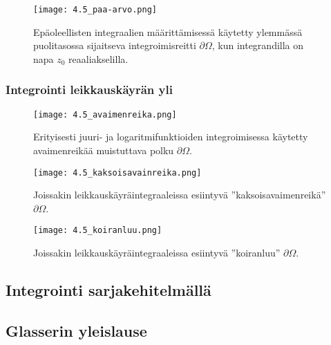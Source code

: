 \documentclass[../integrointiopas.tex]{subfiles}
\begin{document}
	
	\begin{figure}[h!]
		\centering
		\texttt{[image: 4.5\_paa-arvo.png]}
		\caption{Epäoleellisten integraalien määrittämisessä käytetty ylemmässä puolitasossa sijaitseva integroimisreitti $\partial\Omega$, kun integrandilla on napa $z_0$ reaaliakselilla.}
	\end{figure}

	\subsubsection{Integrointi leikkauskäyrän yli}
	
	\begin{figure}[h!]
		\centering
		\texttt{[image: 4.5\_avaimenreika.png]}
		\caption{Erityisesti juuri- ja logaritmifunktioiden integroimisessa käytetty avaimenreikää muistuttava polku $\partial\Omega$.}
	\end{figure}

	\begin{figure}[h!]
		\centering
		\texttt{[image: 4.5\_kaksoisavainreika.png]}
		\caption{Joissakin leikkauskäyräintegraaleissa esiintyvä ''kaksoisavaimenreikä'' $\partial\Omega$.}
	\end{figure}

	\begin{figure}[h!]
		\centering
		\texttt{[image: 4.5\_koiranluu.png]}
		\caption{Joissakin leikkauskäyräintegraaleissa esiintyvä ''koiranluu'' $\partial\Omega$.}
	\end{figure}

	\subsection{Integrointi sarjakehitelmällä}

	\subsection{Glasserin yleislause}
	
	
\end{document}
